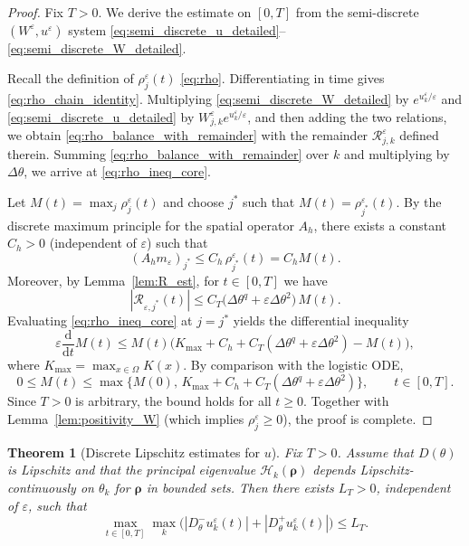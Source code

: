 \documentclass[11pt, dina4, amsfont12]{article}
\newtheorem{theorem}{Theorem}[section]
\begin{document}
\begin{proof}
Fix $T>0$. We derive the estimate on $[0,T]$ from the semi-discrete
$(W^\varepsilon,u^\varepsilon)$ system \eqref{eq:semi_discrete_u_detailed}--%
\eqref{eq:semi_discrete_W_detailed}.

Recall the definition of $\rho_j^\varepsilon(t)$ \eqref{eq:rho}. Differentiating
in time gives \eqref{eq:rho_chain_identity}. Multiplying
\eqref{eq:semi_discrete_W_detailed} by $e^{u_k^\varepsilon/\varepsilon}$ and
\eqref{eq:semi_discrete_u_detailed} by $W_{j,k}^\varepsilon e^{u_k^\varepsilon/\varepsilon}$,
and then adding the two relations, we obtain \eqref{eq:rho_balance_with_remainder}
with the remainder $\mathcal R_{j,k}^\varepsilon$ defined therein. Summing
\eqref{eq:rho_balance_with_remainder} over $k$ and multiplying by $\Delta\theta$,
we arrive at \eqref{eq:rho_ineq_core}.

Let $M(t)=\max_j \rho_j^\varepsilon(t)$ and choose $j^\ast$ such that
$M(t)=\rho_{j^\ast}^\varepsilon(t)$. By the discrete maximum principle for the
spatial operator $A_h$, there exists a constant $C_h>0$ (independent of
$\varepsilon$) such that
\[
(A_h m_\varepsilon)_{j^\ast}\le C_h\,\rho_{j^\ast}^\varepsilon(t)=C_h M(t).
\]
Moreover, by Lemma~\ref{lem:R_est}, for $t\in[0,T]$ we have
\[
|\mathcal R_{\varepsilon,j^\ast}(t)|
\le C_T\big(\Delta\theta^q+\varepsilon\Delta\theta^2\big)\,M(t).
\]
Evaluating \eqref{eq:rho_ineq_core} at $j=j^\ast$ yields the differential inequality
\[
\varepsilon \frac{\mathrm d}{\mathrm dt}M(t)
\le
M(t)\Big(K_{\max}+C_h+C_T(\Delta\theta^q+\varepsilon\Delta\theta^2)-M(t)\Big),
\]
where $K_{\max}=\max_{x\in\Omega}K(x)$. By comparison with the logistic ODE,
\[
0\le M(t)\le \max\Big\{M(0),\,K_{\max}+C_h+C_T(\Delta\theta^q+\varepsilon\Delta\theta^2)\Big\},
\qquad t\in[0,T].
\]
Since $T>0$ is arbitrary, the bound holds for all $t\ge0$. Together with
Lemma~\ref{lem:positivity_W} (which implies $\rho_j^\varepsilon\ge0$), the proof
is complete.
\end{proof}




\begin{theorem}[Discrete Lipschitz estimates for $u$]\label{thm:u_lip}
Fix $T>0$. Assume that $D(\theta)$ is Lipschitz and that the principal eigenvalue
$\mathcal H_k(\boldsymbol\rho)$ depends Lipschitz-continuously on $\theta_k$ for
$\boldsymbol\rho$ in bounded sets. Then there exists $L_T>0$, independent of
$\varepsilon$, such that
\[
\max_{t\in[0,T]}\max_{k}
\big(|D_\theta^-u_k^\varepsilon(t)|+|D_\theta^+u_k^\varepsilon(t)|\big)\le L_T .
\]
\end{theorem}
\end{document}
